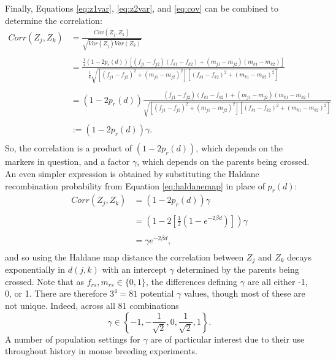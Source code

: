 \documentclass{article}
\begin{document}
Finally, Equations \ref{eq:z1var}, \ref{eq:z2var}, and \ref{eq:cov} can be combined to determine the correlation:
\begin{equation} \label{eq:precorr}
  \begin{split}
    Corr(Z_j, Z_k) & = \frac{Cov(Z_j, Z_k)}{\sqrt{Var(Z_j) Var(Z_k)}}\\
    & \\
    & = \frac{ \frac{1}{4} (1 - 2 p_r(d)) \left [ (f_{j1} - f_{j2})(f_{k1} - f_{k2}) + (m_{j1} - m_{j2})(m_{k1} - m_{k2}) \right ] }{ \frac{1}{4} \sqrt{ \left [ (f_{j1} - f_{j2})^2 + (m_{j1} - m_{j2})^2 \right ] \left [ (f_{k1} - f_{k2})^2 + (m_{k1} - m_{k2})^2 \right ] }} \\
    & \\
    & = (1 - 2 p_r(d)) \frac{ (f_{j1} - f_{j2})(f_{k1} - f_{k2}) + (m_{j1} - m_{j2})(m_{k1} - m_{k2}) }{ \sqrt{ \left [ (f_{j1} - f_{j2})^2 + (m_{j1} - m_{j2})^2 \right ] \left [ (f_{k1} - f_{k2})^2 + (m_{k1} - m_{k2})^2 \right ] }} \\
    & \\
    & := (1 - 2 p_r(d)) \gamma .\\
  \end{split}
\end{equation}
So, the correlation is a product of $(1-2 p_r(d))$, which depends on the markers in question, and a factor $\gamma$, which depends on the parents being crossed. An even simpler expression is obtained by substituting the Haldane recombination probability from Equation \ref{eq:haldanemap} in place of $p_r(d)$:
\begin{equation} \label{eq:corrdist}
  \begin{split}
    Corr(Z_j, Z_k) & = (1 - 2 p_r(d)) \gamma \\
    & \\
    & = \left ( 1 - 2 \left [ \frac{1}{2} \left ( 1 - e^{-2 \beta d} \right ) \right ] \right ) \gamma \\
    & \\
    & = \gamma e^{-2 \beta d}, \\
  \end{split}
\end{equation}
and so using the Haldane map distance the correlation between $Z_j$ and $Z_k$ decays exponentially in $d(j,k)$ with an intercept $\gamma$ determined by the parents being crossed. Note that as $f_{rs}, m_{rs} \in \{0, 1\}$, the differences defining $\gamma$ are all either -1, 0, or 1. There are therefore $3^4 = 81$ potential $\gamma$ values, though most of these are not unique. Indeed, across all 81 combinations
$$\gamma \in \left \{-1, -\frac{1}{\sqrt{2}}, 0, \frac{1}{\sqrt{2}}, 1 \right \}.$$
A number of population settings for $\gamma$ are of particular interest due to their use throughout history in mouse breeding experiments.
\end{document}
